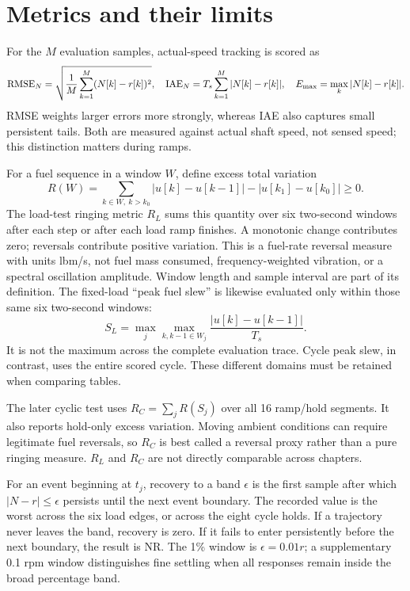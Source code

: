 \section{Metrics and their limits}
For the $M$ evaluation samples, actual-speed tracking is scored as
\begin{equation}
\operatorname{RMSE}_N=\sqrt{\frac1M\sum_{k=1}^M(N[k]-r[k])^2},\quad
\mathrm{IAE}_N=T_s\sum_{k=1}^M|N[k]-r[k]|,\quad
E_{\max}=\max_k|N[k]-r[k]|.
\end{equation}
RMSE weights larger errors more strongly, whereas IAE also captures small persistent tails. Both are measured against actual shaft speed, not sensed speed; this distinction matters during ramps.

For a fuel sequence in a window $W$, define excess total variation
\begin{equation}
R(W)=\sum_{k\in W,\ k>k_0}|u[k]-u[k-1]|-|u[k_1]-u[k_0]|\geq0.
\label{eq:ring}
\end{equation}
The load-test ringing metric $R_L$ sums this quantity over six two-second windows after each step or after each load ramp finishes. A monotonic change contributes zero; reversals contribute positive variation. This is a fuel-rate reversal measure with units lbm/s, not fuel mass consumed, frequency-weighted vibration, or a spectral oscillation amplitude. Window length and sample interval are part of its definition. The fixed-load ``peak fuel slew'' is likewise evaluated only within those same six two-second windows:
\begin{equation}
S_L=\max_j\max_{k,k-1\in W_j}\frac{|u[k]-u[k-1]|}{T_s}.
\end{equation}
It is not the maximum across the complete evaluation trace. Cycle peak slew, in contrast, uses the entire scored cycle. These different domains must be retained when comparing tables.

The later cyclic test uses $R_C=\sum_jR(S_j)$ over all 16 ramp/hold segments. It also reports hold-only excess variation. Moving ambient conditions can require legitimate fuel reversals, so $R_C$ is best called a reversal proxy rather than a pure ringing measure. $R_L$ and $R_C$ are not directly comparable across chapters.

For an event beginning at $t_j$, recovery to a band $\epsilon$ is the first sample after which $|N-r|\leq\epsilon$ persists until the next event boundary. The recorded value is the worst across the six load edges, or across the eight cycle holds. If a trajectory never leaves the band, recovery is zero. If it fails to enter persistently before the next boundary, the result is NR. The 1\% window is $\epsilon=0.01r$; a supplementary 0.1 rpm window distinguishes fine settling when all responses remain inside the broad percentage band.

